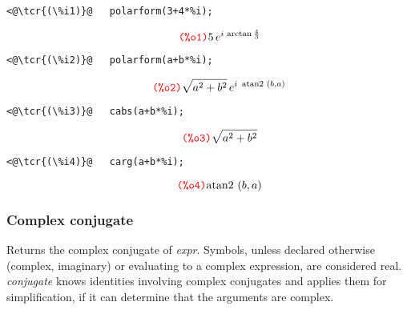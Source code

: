 \documentclass[../Maxima_Workbook.tex]{subfiles}
\begin{document}
\begin{small}
\color{blue} \leqn
\vspace{2mm}\begin{lstlisting}
<@\tcr{(\%i1)}@   polarform(3+4*%i);
\end{lstlisting}
\vspace{-7mm} \[\tag*{\tcr{\ttfamily (\%o1)}} 5 \, e^{i \, \arctan \frac{4}{3}} \]
\vspace{-9mm} 
\begin{lstlisting}
<@\tcr{(\%i2)}@   polarform(a+b*%i);
\end{lstlisting}
\vspace{-5mm} \[\tag*{\tcr{\ttfamily (\%o2)}} \sqrt{a^2+b^2} \, e^{i \, \text{ atan2 } (b,a)} \]
\vspace{-9mm} 
\begin{lstlisting}
<@\tcr{(\%i3)}@   cabs(a+b*%i);
\end{lstlisting}
\vspace{-5mm} \[\tag*{\tcr{\ttfamily (\%o3)}} \sqrt{a^2+b^2} \]
\vspace{-9mm} 
\begin{lstlisting}
<@\tcr{(\%i4)}@   carg(a+b*%i);
\end{lstlisting}
\vspace{-6mm} \[\tag*{\tcr{\ttfamily (\%o4)}} \text{atan2 } (b,a) \]
\vspace{-8mm} 
\color{black} \reqn
\end{small}

\subsubsection{Complex conjugate}\label{DS4b}

\lzz {} \hfill \tcr{[function]}

\lz Returns the complex conjugate of \emph{expr}. Symbols, unless declared otherwise (complex, imaginary) or evaluating to a complex expression, are considered real. \emph{conjugate} knows identities involving complex conjugates and applies them for simplification, if it can determine that the arguments are complex.
\end{document}
